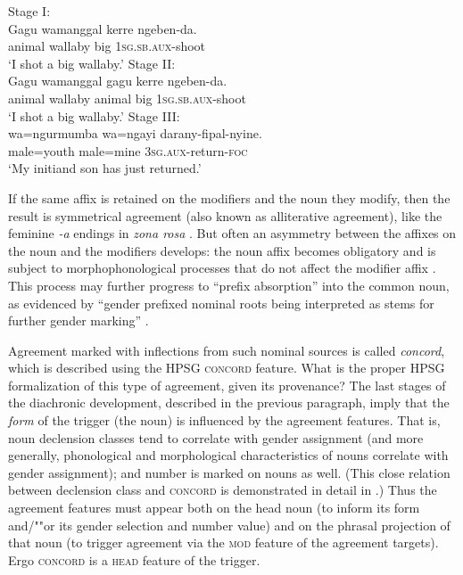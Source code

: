 \documentclass[output=paper
 	        ,biblatex
                ,babelshorthands
                ,newtxmath
                ,draftmode
                ,colorlinks, citecolor=brown
]{langscibook}
\begin{document}
\begin{exe}
\ex
\begin{xlist}
\ex \label{wallaby1} Stage I: \\
\gll 	Gagu	   wamanggal	  kerre    ngeben-da. \\
	     animal	wallaby	      big	      1\textsc{sg.sb.aux}-shoot \\
\glt `I shot a big wallaby.’	
\ex \label{wallaby2} Stage II: \\
\gll 	Gagu	   wamanggal	   gagu	kerre	    ngeben-da. \\
	animal	wallaby	  animal     	big	1\textsc{sg.sb.aux}-shoot\\
\glt `I shot a big wallaby.’
\ex \label{wallaby3} Stage III: \\
\gll 	wa=ngurmumba	wa=ngayi	darany-fipal-nyine. \\
	male=youth		male=mine	\textsc{3sg.aux}-return-\textsc{foc} \\
\glt 	`My initiand son has just returned.’ 
\end{xlist}
\end{exe}

\noindent
If the same affix is retained on the modifiers and the noun they modify, then the result is symmetrical agreement (also known as alliterative agreement), like the feminine \textit{-a} endings in  \textit{zona rosa} \citep[87--88]{corbett:2006}.  But often an asymmetry between the affixes on the  noun and the modifiers develops: the noun affix becomes obligatory and is subject to morphophonological processes that do not affect the modifier affix \citep[216]{reid:1997}.    This process may further progress to ``prefix absorption'' into the common noun, as evidenced by ``gender prefixed nominal roots being interpreted as stems for further gender marking'' \citep[217]{reid:1997}.


Agreement marked with inflections from such nominal sources is called \emph{concord}, which is described using the HPSG \textsc{concord} feature.  What is the proper HPSG formalization of this type of agreement, given its provenance?   The last stages of the diachronic development, described in the previous paragraph, imply that the \textit{form} of the trigger (the noun) is influenced by the agreement features.  That is, noun declension classes tend to correlate with gender assignment (and more generally, phonological and morphological characteristics of nouns correlate with gender assignment); and number is marked on nouns as well.  (This close relation between declension class and \textsc{concord} is demonstrated in detail in \citealt[Chapter~2]{Wechsler+Zlatic:2003}.) Thus the agreement features must appear both on the head noun (to inform its form and/""or its gender selection and number value) and on the phrasal projection of that noun (to trigger agreement via the \textsc{mod} feature of the agreement targets).  Ergo \textsc{concord} is a \textsc{head} feature of the trigger.  
\end{document}
